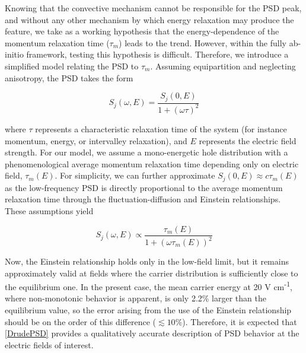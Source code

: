\documentclass[aps,prx,preprint,letterpaper,groupedaddress,longbibliography]{revtex4-2}
\theoremstyle{definition}
\newcommand{\smalleunits}{V cm\textsuperscript{-1}}
\begin{document}
Knowing that the convective mechanism cannot be responsible for the PSD peak, and without any other mechanism by which energy relaxation may produce the feature, we take as a working hypothesis that the energy-dependence of the momentum relaxation time ($\tau_m$) leads to the trend. However, within the fully ab-initio framework, testing this hypothesis is difficult. Therefore, we introduce a simplified model relating the PSD to $\tau_m$. Assuming equipartition and neglecting anisotropy, the PSD takes the form \cite{Reggiani:1985}

\begin{equation}
    S_{j}(\omega,E)
    =
    \frac{S_{j}(0,E)} {1+\left(\omega\tau \right)^2}
\end{equation}

\noindent where $\tau$ represents a characteristic relaxation time of the system (for instance  momentum, energy, or intervalley relaxation), and $E$ represents the electric field strength. For our model, we assume a mono-energetic hole distribution with a phenomenological average momentum relaxation time depending only on electric field, $\tau_m(E)$. For simplicity, we can further approximate $S_{j}(0,E)\approx c\tau_m(E)$ as the low-frequency PSD is directly proportional to the average momentum relaxation time through the fluctuation-diffusion \cite{Gantsevich:1979} and Einstein \cite{Reggiani:1985_2} relationships. These assumptions yield

\begin{equation}
    S_{j}(\omega,E)
    \propto
    \frac{\tau_m(E)} {1+\left(\omega\tau_m(E) \right)^2}
    \label{DrudePSD}
\end{equation}

\noindent Now, the Einstein relationship holds only in the low-field limit, but it remains approximately valid at fields where the carrier distribution is sufficiently close to the equilibrium one. In the present case, the mean carrier energy at 20 \smalleunits, where non-monotonic behavior is apparent, is only 2.2\% larger than the equilibrium value, so the error arising from the use of the Einstein relationship should be on the order of this difference ($\lesssim 10\%$). Therefore, it is expected that \cref{DrudePSD} provides a qualitatively accurate description of PSD behavior at the electric fields of interest.
\end{document}
